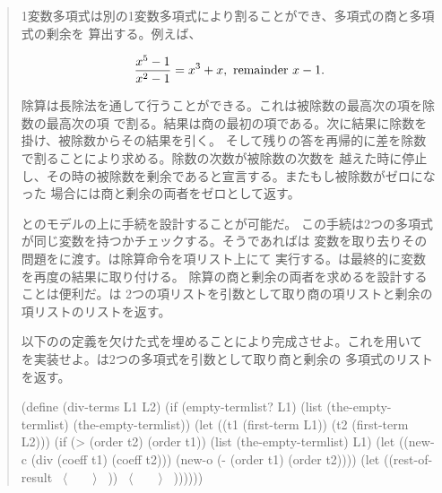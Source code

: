 \begin{quote}
1変数多項式は別の1変数多項式により割ることができ、多項式の商と多項式の剰余を
算出する。例えば、
\begin{comment}

\begin{example}
x^5 - 1
------- = x^3 + x, remainder x - 1
x^2 - 1
\end{example}

\end{comment}
\begin{displaymath}
 {x^5 - 1 \over x^2 - 1} = x^3 + x, \hbox{  remainder  } x - 1. 
\end{displaymath}

除算は長除法を通して行うことができる。これは被除数の最高次の項を除数の最高次の項
で割る。結果は商の最初の項である。次に結果に除数を掛け、被除数からその結果を引く。
そして残りの答を再帰的に差を除数で割ることにより求める。除数の次数が被除数の次数を
越えた時に停止し、その時の被除数を剰余であると宣言する。またもし被除数がゼロになった
場合には商と剰余の両者をゼロとして返す。


とのモデルの上に手続を設計することが可能だ。
この手続は2つの多項式が同じ変数を持つかチェックする。そうであればは
変数を取り去りその問題をに渡す。は除算命令を項リスト上にて
実行する。は最終的に変数を再度の結果に取り付ける。
除算の商と剰余の両者を求めるを設計することは便利だ。は
2つの項リストを引数として取り商の項リストと剰余の項リストのリストを返す。


以下のの定義を欠けた式を埋めることにより完成させよ。これを用いて
を実装せよ。は2つの多項式を引数として取り商と剰余の
多項式のリストを返す。

\begin{smallscheme}
(define (div-terms L1 L2)
  (if (empty-termlist? L1)
      (list (the-empty-termlist) (the-empty-termlist))
      (let ((t1 (first-term L1))
            (t2 (first-term L2)))
        (if (> (order t2) (order t1))
            (list (the-empty-termlist) L1)
            (let ((new-c (div (coeff t1) (coeff t2)))
                  (new-o (- (order t1) (order t2))))
              (let ((rest-of-result
                     ~\( \langle \)~~~~\( \rangle \)~
                     ))
                ~\( \langle \)~~~~\( \rangle \)~
                ))))))
\end{smallscheme}
\end{quote}

